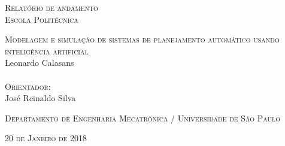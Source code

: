 \begin{titlepage}

\thispagestyle{front}


\Large




\begin{center}
\textsc{Relatório de andamento\\[0.5\baselineskip]
Escola Politécnica\\[0.5\baselineskip]
}

\vspace{3cm}

\huge{\textsc{Modelagem e simulação de sistemas de planejamento automático usando inteligência artificial}}\\[0.5\baselineskip]
Leonardo Calasans\\
{\normalsize \textsc{}}\\



\vspace{1.5cm}
\LARGE{\textsc{Orientador:}}\\[0.1\baselineskip]
 \huge José Reinaldo Silva\\[0.4\baselineskip]
\normalsize \par \textsc{Departamento de Engenharia Mecatrônica / Universidade de São Paulo \\
}


\vfill
\LARGE{\textsc{20 de Janeiro de 2018}}\\

\end{center}

\end{titlepage}

